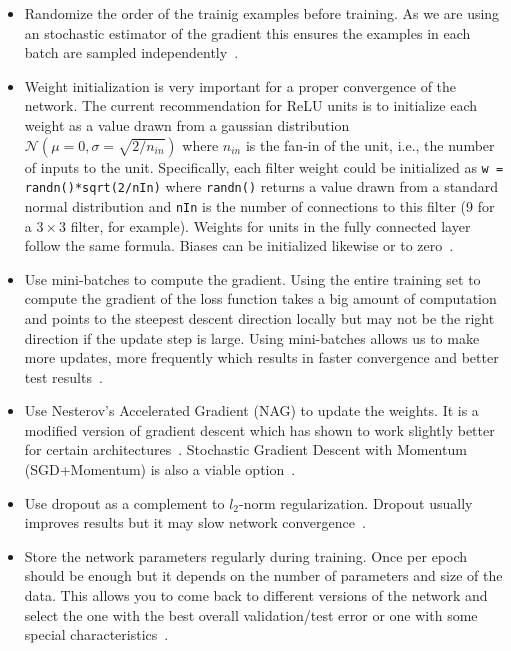 \begin{itemize}
	\item Randomize the order of the trainig examples before training. As we are using an stochastic estimator of the gradient this ensures the examples in each batch are sampled independently~\cite{Bengio2012}.

	\item Weight initialization is very important for a proper convergence of the network. The current recommendation for ReLU units is to initialize each weight as a value drawn from a gaussian distribution $\mathcal{N}(\mu = 0, \sigma = \sqrt{2/n_{in}})$ where $n_{in}$ is the fan-in of the unit, i.e., the number of inputs to the unit. Specifically, each filter weight could be initialized as \texttt{w = randn()*sqrt(2/nIn)} where \texttt{randn()} returns a value drawn from a standard normal distribution and \texttt{nIn} is the number of connections to this filter (9 for a $3\times 3$ filter, for example). Weights for units in the fully connected layer follow the same formula. Biases can be initialized likewise or to zero~\cite{He2015}.

	\item Use mini-batches to compute the gradient. Using the entire training set to compute the gradient of the loss function takes a big amount of computation and points to the steepest descent direction locally but may not be the right direction if the update step is large. Using mini-batches allows us to make more updates, more frequently which results in faster convergence and better test results~\cite{Bengio2012}.

	\item Use Nesterov's Accelerated Gradient (NAG) to update the weights. It is a modified version of gradient descent which has shown to work slightly better for certain architectures~\cite{Bengio2012b}. Stochastic Gradient Descent with Momentum (SGD+Momentum) is also a viable option~\cite{Karpathy2015}.

	\item Use dropout as a complement to $l_2$-norm regularization. Dropout usually improves results but it may slow network convergence~\cite{Krizhevsky2012}.

	\item Store the network parameters regularly during training. Once per epoch should be enough but it depends on the number of parameters and size of the data. This allows you to come back to different versions of the network and select the one with the best overall validation/test error or one with some special characteristics~\cite{Bengio2014}.


\end{itemize}
